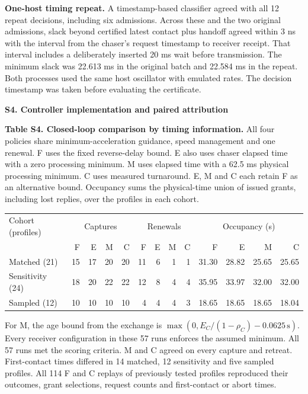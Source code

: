 \documentclass[10pt,letterpaper]{article}
\begin{document}
\textbf{One-host timing repeat.} A timestamp-based classifier agreed with all 12 repeat decisions, including six admissions. Across these and the two original admissions, slack beyond certified latest contact plus handoff agreed within 3 ns with the interval from the chaser's request timestamp to receiver receipt. That interval includes a deliberately inserted 20 ms wait before transmission. The minimum slack was 22.613 ms in the original batch and 22.584 ms in the repeat. Both processes used the same host oscillator with emulated rates. The decision timestamp was taken before evaluating the certificate.

\newpage
{\large\bfseries S4. Controller implementation and paired attribution\par}

\textbf{Table S4. Closed-loop comparison by timing information.} All four policies share minimum-acceleration guidance, speed management and one renewal. F uses the fixed reverse-delay bound. E also uses chaser elapsed time with a zero processing minimum. M uses elapsed time with a 62.5 ms physical processing minimum. C uses measured turnaround. E, M and C each retain F as an alternative bound. Occupancy sums the physical-time union of issued grants, including lost replies, over the profiles in each cohort.

\begin{center}
\setlength{\tabcolsep}{3pt}
\begin{tabular}{@{}lrrrrrrrrrrrr@{}}
\toprule
Cohort (profiles) & \multicolumn{4}{c}{Captures} & \multicolumn{4}{c}{Renewals} & \multicolumn{4}{c}{Occupancy (s)}\\
 & F & E & M & C & F & E & M & C & F & E & M & C\\
\midrule
Matched (21) & 15 & 17 & 20 & 20 & 11 & 6 & 1 & 1 & 31.30 & 28.82 & 25.65 & 25.65\\
Sensitivity (24) & 18 & 20 & 22 & 22 & 12 & 8 & 4 & 4 & 35.95 & 33.97 & 32.00 & 32.00\\
Sampled (12) & 10 & 10 & 10 & 10 & 4 & 4 & 4 & 3 & 18.65 & 18.65 & 18.65 & 18.04\\
\bottomrule
\end{tabular}
\end{center}

For M, the age bound from the exchange is $\max(0,E_C/(1-\rho_C)-0.0625\,\mathrm{s})$. Every receiver configuration in these 57 runs enforces the assumed minimum. All 57 runs met the scoring criteria. M and C agreed on every capture and retreat. First-contact times differed in 14 matched, 12 sensitivity and five sampled profiles. All 114 F and C replays of previously tested profiles reproduced their outcomes, grant selections, request counts and first-contact or abort times.
\end{document}
